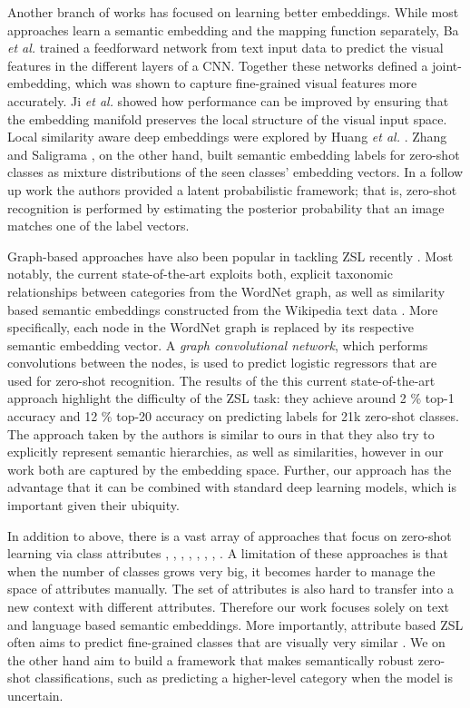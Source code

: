 \documentclass[12pt]{report}
\begin{document}
Another branch of works has focused on learning better embeddings. While most approaches learn a semantic embedding and the mapping function separately, Ba \textit{et al.} \cite{Ba2015} trained a feedforward network from text input data to predict the visual features in the different layers of a CNN. Together these networks defined a joint-embedding, which was shown to capture fine-grained visual features more accurately. Ji \textit{et al.} \cite{Ji2017} showed how performance can be improved by ensuring that the embedding manifold preserves the local structure of the visual input space. Local similarity aware deep embeddings were explored by Huang \textit{et al.} \cite{Huang2016}. Zhang and Saligrama \cite{Zhang2015}, on the other hand, built semantic embedding labels for zero-shot classes as mixture distributions of the seen classes' embedding vectors. In a follow up work the authors \cite{Zhang2015a} provided a latent probabilistic framework; that is, zero-shot recognition is performed by estimating the posterior probability that an image matches one of the label vectors. 

Graph-based approaches have also been popular in tackling ZSL recently \cite{Fu2015a, Changpinyo2016, Wang2018a}. Most notably, the current state-of-the-art \cite{Wang2018a} exploits both, explicit taxonomic relationships between categories from the WordNet graph, as well as similarity based semantic embeddings constructed from the Wikipedia text data \cite{Pennington2014}. More specifically, each node in the WordNet graph is replaced by its respective semantic embedding vector. A \textit{graph convolutional network}, which performs convolutions between the nodes, is used to predict logistic regressors that are used for zero-shot recognition. The results of the this current state-of-the-art approach highlight the difficulty of the ZSL task: they achieve around 2 \% top-1 accuracy and 12 \% top-20 accuracy on predicting labels for 21k zero-shot classes. The approach taken by the authors is similar to ours in that they also try to explicitly represent semantic hierarchies, as well as similarities, however in our work both are captured by the embedding space. Further, our approach has the advantage that it can be combined with standard deep learning models, which is important given their ubiquity.

In addition to above, there is a vast array of approaches that focus on zero-shot learning via class attributes \cite{Farhadi2010}, \cite{Rohrbach2010}, \cite{Rohrbach2011}, \cite{Hwang2014}, \cite{Akata2016}, \cite{Xian2016}, \cite{Romera-Paredes2017}, \cite{Bucher2016}. A limitation of these approaches is that when the number of classes grows very big, it becomes harder to manage the space of attributes manually. The set of attributes is also hard to transfer into a new context \cite{Ba2014} with different attributes. Therefore our work focuses solely on text and language based semantic embeddings. More importantly, attribute based ZSL often aims to predict fine-grained classes that are visually very similar \cite{Xian2016} \cite{Reed2016}. We on the other hand aim to build a framework that makes semantically robust zero-shot classifications, such as predicting a higher-level category when the model is uncertain.
\end{document}

